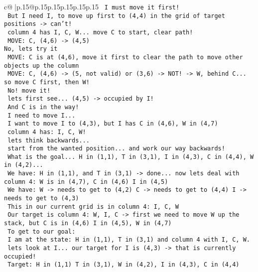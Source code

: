 \documentclass{article}
\begin{document}
{\begin{supertabular}{c@{$\;$}|p{.15\linewidth}@{}p{.15\linewidth}p{.15\linewidth}p{.15\linewidth}p{.15\linewidth}p{.15\linewidth}}
{{{\texttt{ I must move it first!} \\
\texttt{ But I need I, to move up first to (4,4) in the grid of target positions {-}> can't!} \\
\texttt{ column 4 has I, C, W... move C to start, clear path!} \\
\texttt{ MOVE: C, (4,6) {-}> (4,5) } \\
\texttt{No, lets try it} \\
\texttt{ MOVE: C is at (4,6), move it first to clear the path to move other objects up the column} \\
\texttt{ MOVE: C, (4,6) {-}> (5, not valid) or (3,6) {-}> NOT! {-}> W, behind C... so move C first, then W!} \\
\texttt{ No! move it!} \\
\texttt{ lets first see... (4,5) {-}> occupied by I!} \\
\texttt{ And C is in the way!} \\
\texttt{ I need to move I...} \\
\texttt{ I want to move I to (4,3), but I has C in (4,6), W in (4,7)} \\
\texttt{ column 4 has: I, C, W!} \\
\texttt{ lets think backwards...} \\
\texttt{ start from the wanted position... and work our way backwards!} \\
\texttt{ What is the goal... H in (1,1), T in (3,1), I in (4,3), C in (4,4), W in (4,2)... } \\
\texttt{ We have: H in (1,1), and T in (3,1) {-}> done... now lets deal with column 4: W is in (4,7), C in (4,6) I in (4,5)} \\
\texttt{ We have: W {-}> needs to get to (4,2) C {-}> needs to get to (4,4) I {-}> needs to get to (4,3)} \\
\texttt{ This in our current grid is in column 4: I, C, W} \\
\texttt{ Our target is column 4: W, I, C {-}> first we need to move W up the stack, but C is in (4,6) I in (4,5), W in (4,7)} \\
\texttt{ To get to our goal: } \\
\texttt{ I am at the state: H in (1,1), T in (3,1) and column 4 with I, C, W.} \\
\texttt{ lets look at I... our target for I is (4,3) {-}> that is currently occupied!} \\
\texttt{ Target: H in (1,1) T in (3,1), W in (4,2), I in (4,3), C in (4,4) } \\
}}}
\end{supertabular}}
\end{document}
